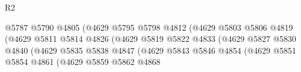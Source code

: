 \begin{lexlean}{R2}
\begin{coremodule}
                                                    @5787
                                                    @5790
                                                    @4805
                                                    (@4629
                                                      @5795
                                                      @5798
                                                      @4812
                                                      (@4629
                                                        @5803
                                                        @5806
                                                        @4819
                                                        (@4629
                                                          @5811
                                                          @5814
                                                          @4826
                                                          (@4629
                                                            @5819
                                                            @5822
                                                            @4833
                                                            (@4629
                                                              @5827
                                                              @5830
                                                              @4840
                                                              (@4629
                                                                @5835
                                                                @5838
                                                                @4847
                                                                (@4629
                                                                  @5843
                                                                  @5846
                                                                  @4854
                                                                  (@4629
                                                                    @5851
                                                                    @5854
                                                                    @4861
                                                                    (@4629
                                                                      @5859
                                                                      @5862
                                                                      @4868

\end{coremodule}
\end{lexlean}
